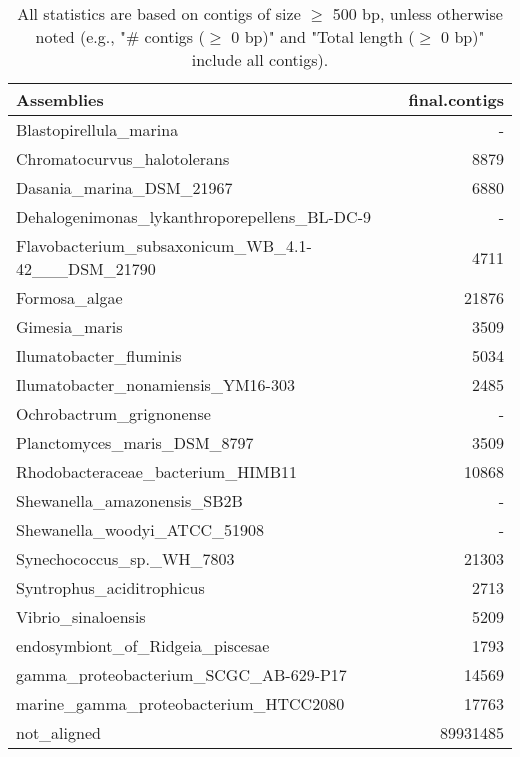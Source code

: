 \documentclass[12pt,a4paper]{article}
\begin{document}
\begin{table}[ht]
\begin{center}
\caption{All statistics are based on contigs of size $\geq$ 500 bp, unless otherwise noted (e.g., "\# contigs ($\geq$ 0 bp)" and "Total length ($\geq$ 0 bp)" include all contigs).}
\begin{tabular}{|l*{1}{|r}|}
\hline
Assemblies & final.contigs \\ \hline
Blastopirellula\_marina & - \\ \hline
Chromatocurvus\_halotolerans & 8879 \\ \hline
Dasania\_marina\_DSM\_21967 & 6880 \\ \hline
Dehalogenimonas\_lykanthroporepellens\_BL-DC-9 & - \\ \hline
Flavobacterium\_subsaxonicum\_WB\_4.1-42\_\_\_DSM\_21790 & 4711 \\ \hline
Formosa\_algae & 21876 \\ \hline
Gimesia\_maris & 3509 \\ \hline
Ilumatobacter\_fluminis & 5034 \\ \hline
Ilumatobacter\_nonamiensis\_YM16-303 & 2485 \\ \hline
Ochrobactrum\_grignonense & - \\ \hline
Planctomyces\_maris\_DSM\_8797 & 3509 \\ \hline
Rhodobacteraceae\_bacterium\_HIMB11 & 10868 \\ \hline
Shewanella\_amazonensis\_SB2B & - \\ \hline
Shewanella\_woodyi\_ATCC\_51908 & - \\ \hline
Synechococcus\_sp.\_WH\_7803 & 21303 \\ \hline
Syntrophus\_aciditrophicus & 2713 \\ \hline
Vibrio\_sinaloensis & 5209 \\ \hline
endosymbiont\_of\_Ridgeia\_piscesae & 1793 \\ \hline
gamma\_proteobacterium\_SCGC\_AB-629-P17 & 14569 \\ \hline
marine\_gamma\_proteobacterium\_HTCC2080 & 17763 \\ \hline
not\_aligned & 89931485 \\ \hline
\end{tabular}
\end{center}
\end{table}
\end{document}
